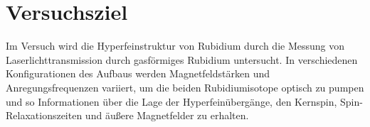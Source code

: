 \section{Versuchsziel}
Im Versuch wird die Hyperfeinstruktur von Rubidium durch die Messung von Laserlichttransmission durch
gasförmiges Rubidium untersucht.
In verschiedenen Konfigurationen des Aufbaus werden Magnetfeldstärken und Anregungsfrequenzen variiert,
um die beiden Rubidiumisotope optisch zu pumpen und so Informationen über die Lage der Hyperfeinübergänge,
den Kernspin, Spin-Relaxationszeiten und äußere Magnetfelder zu erhalten.